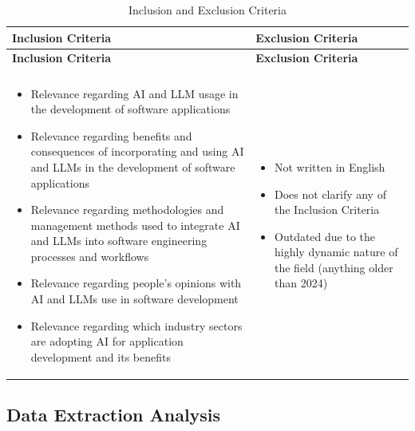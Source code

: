 {\small
\renewcommand{\arraystretch}{1.25}

\begin{longtable}{>{\centering\arraybackslash}p{10.5cm} | >{\centering\arraybackslash}p{4.5cm}}
\caption{Inclusion and Exclusion Criteria}
\label{tab:inclusion_exclusion} \\
\toprule
\textbf{Inclusion Criteria} & \textbf{Exclusion Criteria} \\
\midrule
\endfirsthead

\toprule
\textbf{Inclusion Criteria} & \textbf{Exclusion Criteria} \\
\midrule
\endhead

\midrule
\multicolumn{2}{r}{\textit{Continued on next page}} \\
\midrule
\endfoot

\bottomrule
\endlastfoot

\begin{itemize}[leftmargin=0.6cm, rightmargin=0.6cm, topsep=-0.3cm, itemsep=0.6em]
\item Relevance regarding AI and LLM usage in the development of software applications
\item Relevance regarding benefits and consequences of incorporating and using AI and LLMs in the development of software applications
\item Relevance regarding methodologies and management methods used to integrate AI and LLMs into software engineering processes and workflows
\item Relevance regarding people's opinions with AI and LLMs use in software development
\item Relevance regarding which industry sectors are adopting AI for application development and its benefits
\end{itemize}
&
\begin{itemize}[leftmargin=0.6cm, rightmargin=0.6cm, topsep=-0.3cm, itemsep=0.6em]
\item Not written in English
\item Does not clarify any of the Inclusion Criteria
\item Outdated due to the highly dynamic nature of the field (anything older than 2024)
\end{itemize}
\\

\end{longtable}}


\subsection{Data Extraction Analysis}

